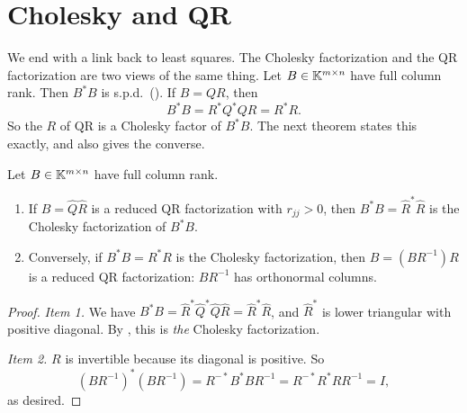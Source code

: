\section{Cholesky and QR}
\label{sec:chol-qr}

We end with a link back to least squares. The Cholesky factorization and the QR factorization are two views of the same thing. Let $B \in \mathbb{K}^{m \times n}$ have full column rank. Then $B^\ast B$ is s.p.d.\ (). If $B = QR$, then
\begin{equation}
  B^\ast B = R^\ast Q^\ast QR = R^\ast R.
\end{equation}
So the $R$ of QR is a Cholesky factor of $B^\ast B$. The next theorem states this exactly, and also gives the converse.

\begin{theorem}
  \label{thm:chol-qr}
  Let $B \in \mathbb{K}^{m \times n}$ have full column rank.
  \begin{enumerate}
    \item If $B = \hat{Q}\hat{R}$ is a reduced QR factorization with $r_{jj} > 0$, then $B^\ast B = \hat{R}^\ast\hat{R}$ is the Cholesky factorization of $B^\ast B$.
    \item Conversely, if $B^\ast B = R^\ast R$ is the Cholesky factorization, then $B = (BR^{-1})R$ is a reduced QR factorization: $BR^{-1}$ has orthonormal columns.
  \end{enumerate}
\end{theorem}

\begin{proof}
  \emph{Item 1.} We have $B^\ast B = \hat{R}^\ast\hat{Q}^\ast\hat{Q}\hat{R} = \hat{R}^\ast\hat{R}$, and $\hat{R}^\ast$ is lower triangular with positive diagonal. By , this is \emph{the} Cholesky factorization.

  \emph{Item 2.} $R$ is invertible because its diagonal is positive. So
  \begin{equation}
    (BR^{-1})^\ast(BR^{-1}) = R^{-\ast}B^\ast BR^{-1} = R^{-\ast}R^\ast RR^{-1} = I,
  \end{equation}
  as desired.
\end{proof}

